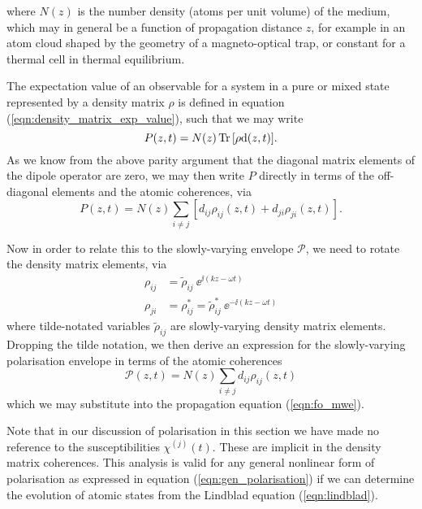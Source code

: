     where $N(z)$ is the number density (atoms per unit volume) of the medium,
    which may in general be a function of propagation distance $z$, for example
    in an atom cloud shaped by the geometry of a magneto-optical
    trap\cite{Adams1997}, or constant for a thermal cell in thermal equilibrium.

    The expectation value of an observable for a system in a pure or mixed state
    represented by a density matrix $\rho$ is defined in equation
    (\ref{eqn:density_matrix_exp_value}), such that we may write
    \begin{equation}
      P(z,t) = N(z) \operatorname{Tr}{ \left[ \rho \mathrm{d}(z,t) \right] }.
    \end{equation}
    As we know from the above parity argument that the diagonal matrix elements
    of the dipole operator are zero, we may then write $P$ directly in terms of
    the off-diagonal elements and the atomic coherences, via
    \begin{equation}
      P(z,t) = N(z) \sum_{i \ne j}{\left[ d_{ij} \rho_{ij}(z,t) + 
                                 d_{ji} \rho_{ji}(z,t) \right] }.
    \end{equation}

    Now in order to relate this to the slowly-varying envelope $\mathcal{P}$, we
    need to rotate the density matrix elements, via
    \begin{align*}
      \rho_{ij} &= \tilde{\rho}_{ij} ~ \ee^{\ii (k z - \omega t)} \\
      \rho_{ji} &= \rho^*_{ij} = \tilde{\rho}^*_{ij} ~ \ee^{-\ii (k z - \omega t)}
    \end{align*}
    where tilde-notated variables $\tilde{\rho}_{ij}$ are slowly-varying density
    matrix elements. Dropping the tilde notation, we then derive an expression
    for the slowly-varying polarisation envelope in terms of the atomic
    coherences
    \begin{equation} 
      \mathcal{P}(z,t) = N(z) \sum_{i \ne j} d_{ij} \rho_{ij}(z,t)
      \label{eqn:polarisation_coherences}
    \end{equation} 
    which we may substitute into the propagation equation
    (\ref{eqn:fo_mwe}).

    Note that in our discussion of polarisation in this section we have made no
    reference to the susceptibilities $\chi^{(j)}(t)$. These are implicit in the
    density matrix coherences. This analysis is valid for any general nonlinear
    form of polarisation as expressed in equation (\ref{eqn:gen_polarisation})
    if we can determine the evolution of atomic states from the Lindblad
    equation (\ref{eqn:lindblad}). 

